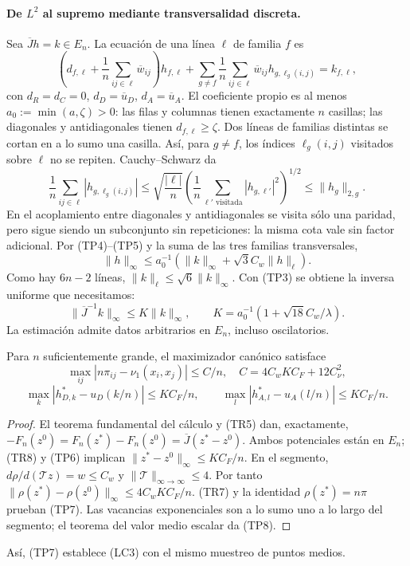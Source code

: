 \paragraph{De $L^2$ al supremo mediante transversalidad discreta.}
Sea $\overline Jh=k\in E_n$. La ecuación de una línea $\ell$ de familia
$f$ es
\[
 \left(d_{f,\ell}+\frac1n\sum_{ij\in\ell}\overline w_{ij}\right)h_{f,\ell}
 +\sum_{g\ne f}\frac1n\sum_{ij\in\ell}\overline w_{ij}h_{g,\ell_g(i,j)}
 =k_{f,\ell},
                                                        \tag{TP4}
\]
con $d_R=d_C=0$, $d_D=\overline u_D$, $d_A=\overline u_A$.
El coeficiente propio es al menos $a_0:=\min(a,\zeta)>0$:
las filas y columnas tienen exactamente $n$ casillas; las diagonales y antidiagonales tienen
$d_{f,\ell}\ge\zeta$.
Dos líneas de familias distintas se cortan en a lo sumo una casilla.
Así, para $g\ne f$, los índices $\ell_g(i,j)$ visitados sobre $\ell$
no se repiten. Cauchy--Schwarz da
\[
 \frac1n\sum_{ij\in\ell}|h_{g,\ell_g(i,j)}|
 \le\sqrt{\frac{|\ell|}{n}}
       \left(\frac1n\sum_{\ell'\text{ visitada}}|h_{g,\ell'}|^2\right)^{1/2}
 \le\|h_g\|_{2,g}.
                                                        \tag{TP5}
\]
En el acoplamiento entre diagonales y antidiagonales se visita sólo una paridad, pero sigue siendo
un subconjunto sin repeticiones: la misma cota vale sin factor adicional.
Por (TP4)--(TP5) y la suma de las tres familias transversales,
\[
 \|h\|_\infty\le a_0^{-1}
       (\|k\|_\infty+\sqrt3 C_w\|h\|_\ell).
\]
Como hay $6n-2$ líneas, $\|k\|_\ell\le\sqrt6\|k\|_\infty$.
Con (TP3) se obtiene la inversa uniforme que necesitamos:
\[
 \|\overline J^{-1}k\|_\infty\le K\|k\|_\infty,
 \qquad K=a_0^{-1}(1+\sqrt{18}C_w/\lambda).
                                                        \tag{TP6}
\]
La estimación admite datos arbitrarios en $E_n$, incluso oscilatorios.

\begin{proposicion}
Para $n$ suficientemente grande, el maximizador canónico satisface
\[
 \max_{ij}|n\pi_{ij}-\nu_1(x_i,x_j)|\le C/n,
 \quad C=4C_wKC_F+12C_\nu^2,
                                                        \tag{TP7}
\]
\[
 \max_k|h^*_{D,k}-u_D(k/n)|\le KC_F/n,\qquad
 \max_l|h^*_{A,l}-u_A(l/n)|\le KC_F/n.
                                                        \tag{TP8}
\]
\end{proposicion}
\begin{proof}
El teorema fundamental del cálculo y (TR5) dan, exactamente,
$-F_n(z^0)=F_n(z^*)-F_n(z^0)=\overline J(z^*-z^0)$.
Ambos potenciales están en $E_n$; (TR8) y (TP6) implican
$\|z^*-z^0\|_\infty\le KC_F/n$.
En el segmento, $d\rho/d(\mathcal Tz)=w\le C_w$ y
$\|\mathcal T\|_{\infty\to\infty}\le4$. Por tanto
$\|\rho(z^*)-\rho(z^0)\|_\infty\le4C_wKC_F/n$.
(TR7) y la identidad $\rho(z^*)=n\pi$ prueban (TP7).
Las vacancias exponenciales son a lo sumo uno a lo largo del segmento;
el teorema del valor medio escalar da (TP8).
\end{proof}

Así, (TP7) establece (LC3) con el mismo muestreo de puntos medios.
